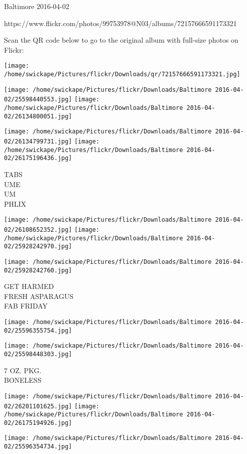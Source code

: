 \documentclass[10pt,letterpaper]{article}
\begin{document}
Baltimore 2016-04-02

https://www.flickr.com/photos/99753978@N03/albums/72157666591173321

Scan the QR code below to go to the original album with full-size photos on Flickr:

\texttt{[image: /home/swickape/Pictures/flickr/Downloads/qr/72157666591173321.jpg]}
\pagebreak

\texttt{[image: /home/swickape/Pictures/flickr/Downloads/Baltimore 2016-04-02/25598440553.jpg]}
\texttt{[image: /home/swickape/Pictures/flickr/Downloads/Baltimore 2016-04-02/26134800051.jpg]}

\texttt{[image: /home/swickape/Pictures/flickr/Downloads/Baltimore 2016-04-02/26134799731.jpg]}
\texttt{[image: /home/swickape/Pictures/flickr/Downloads/Baltimore 2016-04-02/26175196436.jpg]}

TABS\\
UME\\
UM\\
PHLIX
\pagebreak

\texttt{[image: /home/swickape/Pictures/flickr/Downloads/Baltimore 2016-04-02/26108652352.jpg]}
\texttt{[image: /home/swickape/Pictures/flickr/Downloads/Baltimore 2016-04-02/25928242970.jpg]}

\texttt{[image: /home/swickape/Pictures/flickr/Downloads/Baltimore 2016-04-02/25928242760.jpg]}

GET HARMED\\
FRESH ASPARAGUS\\
FAB FRIDAY
\pagebreak

\texttt{[image: /home/swickape/Pictures/flickr/Downloads/Baltimore 2016-04-02/25596355754.jpg]}

\vspace{0.25in}
\texttt{[image: /home/swickape/Pictures/flickr/Downloads/Baltimore 2016-04-02/25598448303.jpg]}

7 OZ. PKG.\\
BONELESS
\pagebreak

\texttt{[image: /home/swickape/Pictures/flickr/Downloads/Baltimore 2016-04-02/26201101625.jpg]}
\texttt{[image: /home/swickape/Pictures/flickr/Downloads/Baltimore 2016-04-02/26175194926.jpg]}

\vspace{0.25in}
\texttt{[image: /home/swickape/Pictures/flickr/Downloads/Baltimore 2016-04-02/25596354734.jpg]}
\end{document}
